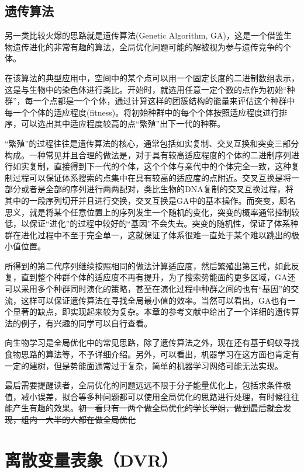 \documentclass[12pt,a4paper,openany,twoside]{book}
\numberwithin{equation}{section}
\begin{document}
      \section{遗传算法}
        另一类比较火爆的思路就是遗传算法(Genetic Algorithm, GA)，这是一个借鉴生物遗传进化的非常有趣的算法，全局优化问题可能的解被视为参与遗传竞争的个体。
        
        在该算法的典型应用中，空间中的某个点可以用一个固定长度的二进制数组表示，这是与生物中的染色体进行类比。开始时，就选用任意一定个数的点作为初始“种群”，每一个点都是一个个体，通过计算这样的团簇结构的能量来评估这个种群中每一个个体的适应程度(fitness)。将初始种群中的每个个体按照适应程度进行排序，可以选出其中适应程度较高的点“繁殖”出下一代的种群。
        
        “繁殖”的过程往往是遗传算法的核心，通常包括如实复制、交叉互换和突变三部分构成。一种常见并且合理的做法是，对于具有较高适应程度的个体的二进制序列进行如实复制，直接得到下一代的个体，这个个体与亲代中的个体完全一致，这种复制过程可以保证体系搜索的点集中在具有较高的适应度的点附近。交叉互换是将一部分或者是全部的序列进行两两配对，类比生物的DNA复制的交叉互换过程，将其中的一段序列切开并且进行交换，交叉互换是GA中的基本操作。而突变，顾名思义，就是将某个任意位置上的序列发生一个随机的变化，突变的概率通常控制较低，以保证“进化”的过程中较好的“基因”不会失去。突变的随机性，保证了体系种群在进化过程中不至于完全单一，这就保证了体系很难一直处于某个难以跳出的极小值位置。

        所得到的第二代序列继续按照相同的做法计算适应度，然后繁殖出第三代，如此反复，直到整个种群个体的适应度不再有提升，为了搜索势能面的更多区域，GA还可以采用多个种群同时演化的策略，甚至在演化过程中种群之间的也有“基因”的交流，这样可以保证遗传算法在寻找全局最小值的效率。当然可以看出，GA也有一个显著的缺点，即实现起来较为复杂。本章的参考文献中给出了一个详细的遗传算法的例子，有兴趣的同学可以自行查看。

        向生物学习是全局优化中的常见思路，除了遗传算法之外，现在还有基于蚂蚁寻找食物思路的算法等，不予详细介绍。另外，可以看出，机器学习在这方面也肯定有一定的建树，但是势能面通常过于复杂，简单的机器学习网络可能无法实现。

        最后需要提醒读者，全局优化的问题远远不限于分子能量优化上，包括求条件极值，减小误差，拟合等多种问题都可以使用全局优化的思路进行处理，有时候往往能产生有趣的效果。\sout{初一看只有一两个做全局优化的学长学姐，做到最后就会发现，组内一大半的人都在做全局优化}


    \chapter{离散变量表象（DVR）}
\end{document}
